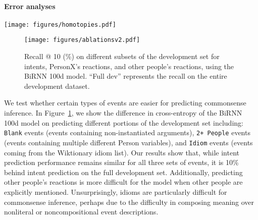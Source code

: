 \documentclass[11pt,a4paper]{article}
\begin{document}
\paragraph{Error analyses}



\begin{figure*}[tb]
    \centering
    \texttt{[image: figures/homotopies.pdf]}
    \caption{Sample predictions from homotopic embeddings (gradual interpolation between Event1 and Event2), selected from the top 10 beam elements decoded in the sequence generation setup. Examples highlight differences captured when ideas are similar (\textit{going to} and \textit{coming from} school), when only a single word differs (\textit{washes} versus \textit{cuts}), and when two events are unrelated.} \label{fig:homotopies}
\end{figure*}

\begin{figure}[t]
    \centering
    \texttt{[image: figures/ablationsv2.pdf]}
    \caption{Recall @ 10 (\%) on different subsets of the development set for intents, PersonX's reactions, and other people's reactions, using the BiRNN 100d model. ``Full dev'' represents the recall on the entire development dataset.}
    \label{fig:ablations}
\end{figure}










We test whether certain types of events are easier for predicting commonsense inference.
In Figure~\ref{fig:ablations}, we show the difference in cross-entropy of the BiRNN 100d model on predicting different portions of the development set including:
\texttt{Blank} events (events containing non-instantiated arguments), \texttt{2+ People} events (events containing multiple different Person variables), and \texttt{Idiom} events (events coming from the Wiktionary idiom list). 
Our results show that, while intent prediction performance remains similar for all three sets of events, it is 10\% behind intent prediction on the full development set.
Additionally, predicting other people's reactions is more difficult for the model when 
other people are explicitly mentioned. Unsurprisingly, idioms are particularly difficult for commonsense inference, perhaps due to the difficulty in composing meaning over nonliteral or noncompositional event descriptions.
\end{document}
